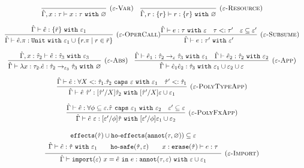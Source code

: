 \documentclass{llncs}
\newcommand{\keywadj}[1]{\mathtt{#1}}
\newcommand{\keyw}[1]{\keywadj{#1}~}
\newcommand{\kw}[1]{\keyw{ #1 }}
\newcommand{\kwa}[1]{\keywadj{ #1 }}
\newcommand{\hyphen}{\hbox{-}}
\newcommand{\hofx}[1]{ \kwa{ho \hyphen effects}(#1) }
\newcommand{\annot}[2]{
	\keywadj{annot}(#1, #2)
}
\newcommand{\poly}[2]{
	\forall #1. #2
}
\begin{document}
\[
\begin{array}{c}

\infer[\textsc{($\varepsilon$-Var)}]
	{ \hat \Gamma, x:\tau \vdash x: \tau~\kw{with} \varnothing }
	{}
~~~
\infer[\textsc{($\varepsilon$-Resource)}]
 	{ \hat \Gamma, r: \{ r \} \vdash r : \{ r \}~\kw{with} \varnothing }
 	{}\\[2ex]
 

\infer[\textsc{($\varepsilon$-OperCall)}]
	{ \hat \Gamma \vdash \hat e.\pi: \kw{Unit} \kw{with} \varepsilon_1 \cup \{ r.\pi \mid r \in \bar r \} }
	{ \hat \Gamma \vdash \hat e: \{ \bar r \}~\kw{with} \varepsilon_1}

\infer[\textsc{($\varepsilon$-Subsume)}]
	{\hat \Gamma \vdash e: \tau' ~\kw{with} \varepsilon'}
	{\hat \Gamma \vdash e: \tau ~\kw{with} \varepsilon & \tau <: \tau' & \varepsilon \subseteq \varepsilon'}\\[2ex]

	\infer[\textsc{($\varepsilon$-Abs)}]
	{ \hat \Gamma \vdash \lambda x:\tau_2 . \hat e : \hat \tau_2 \rightarrow_{\varepsilon_3} \hat \tau_3~\kw{with} \varnothing }
	{ \hat \Gamma, x: \hat \tau_2 \vdash \hat e: \hat \tau_3~\kw{with} \varepsilon_3 }
	~~~
\infer[\textsc{($\varepsilon$-App)}]
	{ \hat \Gamma \vdash \hat e_1 \hat e_2 : \hat \tau_3~\kw{with} \varepsilon_1 \cup \varepsilon_2 \cup \varepsilon  }
	{ \hat \Gamma \vdash \hat e_1: \hat \tau_2 \rightarrow_{\varepsilon} \hat \tau_3~\kw{with} \varepsilon_1 & \hat \Gamma \vdash \hat e_2: \hat \tau_2~\kw{with} \varepsilon_2 } \\[2ex]

\infer[\textsc{($\varepsilon$-PolyTypeApp)}]
	{ \hat \Gamma \vdash \hat e~\hat \tau' : [\hat \tau'/X]\hat \tau_2~\kw{with}  [\hat \tau'/X]\varepsilon \cup \varepsilon_1 }
	{ \hat \Gamma \vdash \hat e : \poly{X <: \hat \tau_1}{\hat \tau_2}~\kw{caps} \varepsilon~\kw{with} \varepsilon_1 & \hat \tau' <: \hat \tau_1} \\[2ex]

\infer[\textsc{($\varepsilon$-PolyFxApp)}]
	{ \hat \Gamma \vdash \hat e~\varepsilon : [\varepsilon'/\phi]\hat \tau~\kw{with} [\varepsilon'/\phi]\varepsilon_1 \cup \varepsilon_2 }
	{ \hat \Gamma \vdash \hat e: \forall \phi \subseteq \varepsilon. \hat \tau~\kw{caps} \varepsilon_1~\kw{with} \varepsilon_2 & \varepsilon' \subseteq \varepsilon } \\[2ex]

\infer[\textsc{($\varepsilon$-Import)}]
	{ \hat \Gamma \vdash \kwa{import}(\varepsilon)~x = \hat e~\kw{in} e: \kwa{annot}(\tau, \varepsilon)~\kw{with} \varepsilon \cup \varepsilon_1 }
{{\def\arraystretch{1.4}
  \begin{array}{c}
\kwa{effects}(\hat \tau) \cup \hofx{\annot{\tau}{\varnothing}}\subseteq \varepsilon \\
\hat \Gamma \vdash \hat e: \hat \tau~\kw{with} \varepsilon_1 ~~~~~~ \kwa{ho \hyphen safe}(\hat \tau, \varepsilon) ~~~~~~ x: \kwa{erase}(\hat \tau) \vdash e: \tau
  \end{array}}} 
 
 
\end{array}
\]
\end{document}
